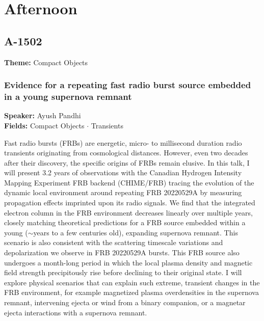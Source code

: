 \section*{Afternoon}

\subsection*{A-1502}
\textbf{Theme:} Compact Objects

\hypertarget{abstract-talk-52}{}\label{abstract-page-talk-52}
\subsubsection*{Evidence for a repeating fast radio burst source embedded in a young supernova remnant}
\textbf{Speaker:} Ayush Pandhi\\
\textbf{Fields:} Compact Objects $\cdot$ Transients

Fast radio bursts (FRBs) are energetic, micro- to millisecond duration radio transients originating from cosmological distances. However, even two decades after their discovery, the specific origins of FRBs remain elusive. In this talk, I will present 3.2 years of observations with the Canadian Hydrogen Intensity Mapping Experiment FRB backend (CHIME/FRB) tracing the evolution of the dynamic local environment around repeating FRB 20220529A by measuring propagation effects imprinted upon its radio signals. We find that the integrated electron column in the FRB environment decreases linearly over multiple years, closely matching theoretical predictions for a FRB source embedded within a young ($\sim$years to a few centuries old), expanding supernova remnant. This scenario is also consistent with the scattering timescale variations and depolarization we observe in FRB 20220529A bursts. This FRB source also undergoes a month-long period in which the local plasma density and magnetic field strength precipitously rise before declining to their original state. I will explore physical scenarios that can explain such extreme, transient changes in the FRB environment, for example magnetized plasma overdensities in the supernova remnant, intervening ejecta or wind from a binary companion, or a magnetar ejecta interactions with a supernova remnant.

\hypertarget{abstract-talk-137}{}\label{abstract-page-talk-137}
